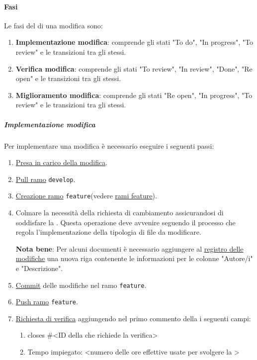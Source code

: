 \paragraph{Fasi}
Le fasi del  di una modifica sono:
\begin{enumerate}
    \item \textbf{Implementazione modifica}: comprende gli stati "To do", "In progress", "To review" e le transizioni tra gli stessi.

    \item \textbf{Verifica modifica}: comprende gli stati "To review", "In review", "Done", "Re open" e le transizioni tra gli stessi.
    
  
    \item \textbf{Miglioramento modifica}: comprende gli stati "Re open", "In progress", "To review" e le transizioni tra gli stessi. 
  
\end{enumerate}

\subparagraph{Implementazione modifica}
Per implementare una modifica è necessario eseguire i seguenti passi:
\begin{enumerate}
\item \hyperref[subpar:presa_carico_modifica]{Presa in carico della modifica}.

\item \hyperref[subpar:pull]{Pull ramo} \texttt{develop}.

\item \hyperref[subpar:branch]{Creazione ramo} \texttt{feature}(vedere \hyperref[item:rami_feature]{rami feature}).

\item Colmare la necessità della richiesta di cambiamento assicurandosi di soddisfare la .
Questa operazione deve avvenire seguendo il processo che regola l'implementazione della tipologia di file da modificare.

\textbf{Nota bene}: Per alcuni documenti è necessario aggiungere al \hyperref[par:registro_delle_modifiche]{registro delle modifiche} una nuova riga contenente le informazioni per le colonne "Autore/i" e "Descrizione". 

\item \hyperref[subpar:commit]{Commit} delle modifiche nel ramo \texttt{feature}.

\item \hyperref[subpar:push]{Push ramo} \texttt{feature}.

\item \hyperref[subpar:github_richiesta_di_verifica]{Richiesta di verifica} aggiungendo nel primo commento della
  i seguenti campi:
 \begin{enumerate}
    \item closes \#\textless ID della  che richiede la verifica\textgreater
    \item Tempo impiegato: \textless numero delle ore effettive usate per svolgere la \textgreater
 \end{enumerate}

\end{enumerate}


